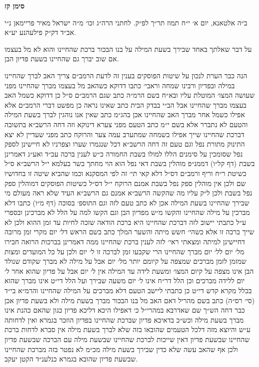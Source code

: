 \documentclass[12pt, openany]{book}
\newcommand{\chapname}{}
\newcommand{\newchap}[1]{
	\addcontentsline{toc}{chapter}{#1}
	\renewcommand{\chapname}{#1}
		\begin{center}
			\textbf{%
\fontsize{16pt}{16pt}\selectfont
				#1}
		\end{center}
}
\begin{document}
\newchap{סימן קז}
\begin{multicols}{2}
ב״ה אלטאנא, יום א׳ י״ח תמוז תר״ך לפ״ק. לחתני הרה״ג וכו׳ מ״ה ישראל מאיר פריימאן נ״י אב״ד דק״ק פילעהנע יע״א.\\\vspace{0pt}

על דבר שאלתך באחד שבירך בשעת המילה על בנו הבכור ברכת שהחיינו והוא לא מל בעצמו אם שוב יברך גם שהחיינו בשעת פדיון הבן.\\\vspace{0pt}

הנה כבר הערת לנכון על שיטות הפוסקים בענין זה לדעת הרמב״ם צריך האב לברך שהחיינו במילה ובפדיון ורבינו שמחה וראבי׳ כתבו דדוקא כשהאב מל בעצמו מברך שהחיינו מפני שעושה המצו׳ המוטלת עליו ובא״ח בשם הרמ״ה כתב שגם הרמב״ם ס״ל כן דדוקא כשמל האב בעצמו מברך שהחיינו אבל הב״י בבדק הבית כתב שאינו נראה כן מפשט דברי הרמב״ם אלא אפילו כשמל אחר מברך האב שהחיינו אכן בהג״מ כתב שאין אנו נוהגין לברך בשעת המילה והטעם לא נתברר אלא בשם י״מ כתב הטעם מפני צערא דינוקא וזה דחה הרשב״א בתשובה דברכת שהחיינו שייך אפילו בשמחה שמתערב עמה צער והרוקח כתב מפני שעדיין לא יצא התינוק מתורת נפל וגם טעם זה דחה הרשב״א דכל שנגמרו שערו וצפרניו לא חיישינן לספק נפל שסומכין על סימנים הללו למולו בשבת החמורה כ״ש לענין ברכה עכ״ד ואע״ג דאמרינן בשבת (דף קל״ו) דממנ״פ מוהלין בשבת דאי נפל הוא הוי מחתך בשר בעלמא י״ל הרשב״א ס״ל כשיטת ר״ח וריף ורמב״ם דס״ל דלא קאי תי׳ זה לפי המסקנא וכמו שהביא שיטה זו בחדושיו שם ולכן אין מוהלין ספק נפל בשבת אמנם הרוקח י״ל דס״ל כשיטות הפוסקים דמוהלין ספק נפל בשבת ולכן ל״ק עליו מה שהקשה הרשב״א אמנם גם הרשב״א העיד שלא ראה מעולם מי שבירך שהחיינו בשעת המילה אכן לא כתב טעם לזה וגם התוספ׳ בסוכה (דף מ״ו) כתבו דלא מברכין על מילה שהחיינו והקשו מ״ש מפדיון הבן וגם הקשו למה על הלל לא מברכינן ובספרי ע״ל כתבתי יישוב לזה דברכת שהחיינו היא ברכת הודאה שזכה לחיות עד זמן ההוא ולכן לא שייך ברכה זו אלא כשהי׳ חשש מיתה והשער המלך כתב בשם הראש דל׳ יום מקרי זמן מרובה דחיישינן למיתה ומצאתי ראי׳ לזה לענין ברכת שהחיינו ממה דאמרינן בברכות הרואה חבירו מל׳ יום לל׳ יום מברך שהחיינו הרי שקבעו זמן לברכה זו ל׳ יום ולכן על כל המועדים ומצות שמזמן לזמן מברכים שמצפה על קיומם יותר מל׳ יום אבל על מילה לא מברך שקודם שנולד הבן אינו מצפה על קיום המצו׳ ומשעת לידה עד המילה אין ל׳ יום אבל על פדיון שהוא אחר ל׳ יום ללידה מברכים וכן הלל דר״ח אינו ל׳ יום משעה שבירך ועל הלל די״ט אינו מברך שהוא בכלל מקרא קדש די״ט כן כתבתי ליישב הטעם דלא מברכים על המילה שהחיינו והרמ״א בי״ד (סי׳ רס״ה) כתב בשם מהריל דאם האב מל בנו הבכור מברך בשעת מילה ולא בשעת פדיון אכן כבר דחה הש״ך שם שאדרבא במהרי״ל כ׳ דאפילו היכא דליכא פדיון כגון שהאם כהנת אינו מברך בשעת מילה וכש״כ בדאיכא פדיון שברכת שהחיינו בפדיון הוזכר בגמרא ואין לדחותה ע״ש והיוצא מזה דלכל הטעמים שהובאו בזה שלא לברך בשעת מילה אין סברא לדחות ברכת שהחיינו שבשעת פדיון דאין שייכות לברכת שהחיינו שבשעת מילה עם הברכה שבשעת פדיון ולכן אף שהאב עשה שלא כדין שבירך בשעת מילה מכ״מ לא נפטר בזה מברכת שהחיינו שבשעת פדיון שהובא בגמרא כנלענ״ד הקטן יעקב.\\\vspace{0pt}

\end{multicols}\newpage
\end{document}
